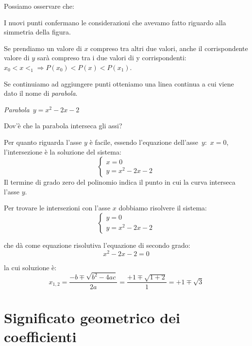 Possiamo osservare che:

\begin{enumerate*}
 \item I nuovi punti confermano le considerazioni che avevamo fatto riguardo 
 alla simmetria della figura.
 \item Se prendiamo un valore di $x$ compreso tra altri due valori, anche il 
 corrispondente valore di $y$ sarà compreso tra i due valori di y 
 corrispondenti:~$x_0 < x <_1 \Rightarrow P(x_0) < P(x) < P(x_1)$.
\end{enumerate*}

Se continuiamo ad aggiungere punti otteniamo una linea continua a cui viene 
dato il nome di \emph{parabola}.

\begin{minipage}{.40\textwidth}
\begin{center}
 \begin{inaccessibleblock}
  
  \emph{Parabola~$y=x^2-2x-2$}\label{fig:parabola_trinomio2}
\end{inaccessibleblock}
\end{center}
\end{minipage}
\begin{minipage}{.55\textwidth}
Dov'è che la parabola interseca gli assi?

Per quanto riguarda l'asse $y$ è facile, essendo l'equazione 
dell'asse~$y$:~$x=0$,
l'intersezione è la soluzione del sistema:
\[\left\{\begin{array}{l}
 x=0 \\
 y=x^2-2x-2 
\end{array}\right.\]
Il termine di grado zero del polinomio indica il punto in cui la curva 
interseca l'asse $y$. 

Per trovare le intersezioni con l'asse $x$ dobbiamo risolvere il sistema:
\[\left\{\begin{array}{l}
 y=0 \\
 y=x^2-2x-2 
\end{array}\right.\]

che dà come equazione risolutiva l'equazione di secondo grado:
\[x^2-2x-2=0\]

la cui soluzione è:
\[x_{1, 2} = \frac{-b \mp\sqrt{b^2-4ac}}{2a}=
             \frac{+1 \mp\sqrt{1+2}}{1}=+1 \mp\sqrt{3}\]

\end{minipage}


\section{Significato geometrico dei coefficienti}
\label{sec:parabola_coefficienti}

